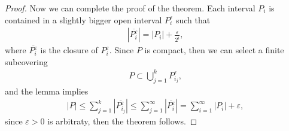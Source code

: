 \documentclass[11pt]{book}
\theoremstyle{definition}
\numberwithin{equation}{chapter}
\begin{document}
\begin{proof}
Now we can complete the proof of the theorem. Each interval $P_i$ is contained in a slightly bigger open interval $P_i^\varepsilon$ such that
\begin{align*}
    \left|\overline{P_i^\varepsilon}\right| = \left|P_i\right| + \frac{\varepsilon}{2^i},
\end{align*}
where $\overline{P_i^\varepsilon}$ is the closure of $P_i^\varepsilon$. Since $P$ is compact, then we can select a finite subcovering 
\begin{align*}
    P \subset \bigcup^k_{j=1} P_{i_j}^\varepsilon,
\end{align*}
and the lemma implies
\begin{align*}
    \left|P\right| \leq \sum^k_{j=1} \left|\overline{P_{i_j}^\varepsilon} \right| \leq \sum^\infty_{j=1} \left| \overline{P_{i}^\varepsilon} \right| = \sum^\infty_{i=1} \left|P_{i}\right| + \varepsilon,
\end{align*}
since $\varepsilon > 0$ is arbitraty, then the theorem follows.
\end{proof}

\medskip
\end{document}
